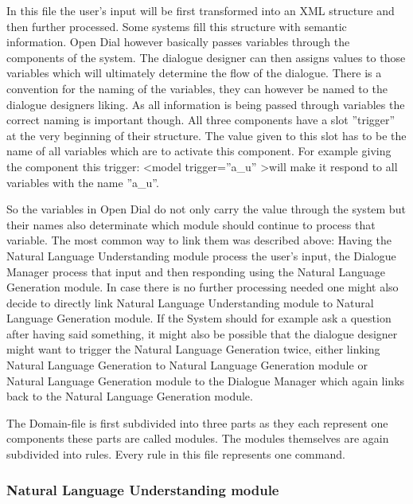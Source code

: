 In this file the user's input will be first transformed into an XML structure and then further processed.
Some systems fill this structure with semantic information. 
Open Dial however basically passes variables through the components of the system. 
The dialogue designer can then assigns values to those variables which will ultimately determine the flow of the dialogue. 
There is a convention for the naming of the variables, they can however be named to the dialogue designers liking. 
As all information is being passed through variables the correct naming is important though. 
All three components have a slot ”trigger” at the very beginning of their structure. 
The value given to this slot has to be the name of all variables which are to activate this component.
For example giving the component this trigger: 
\textless model trigger=”a\_u” \textgreater will make it respond to all variables with the name ”a\_u”.  \newline

So the variables in Open Dial do not only carry the value through the system but their names also determinate which module should continue to process that variable.
The most common way to link them was described above: 
Having the Natural Language Understanding module process the user's input, the Dialogue Manager process that input and then responding using the Natural Language Generation module. 
In case there is no further processing needed one might also decide to directly link Natural Language Understanding module to Natural Language Generation module. 
If the System should for example ask a question after having said something, it might also be possible that the dialogue designer might want to trigger the Natural Language Generation twice, either linking Natural Language Generation to Natural Language Generation module or Natural Language Generation module to the Dialogue Manager which again links back to the Natural Language Generation module. \newline

The Domain-file is first subdivided into three parts as they each represent one components these parts are called modules. 
The modules themselves are again subdivided into rules. Every rule in this file represents one command. 

\subsubsection{Natural Language Understanding module}

